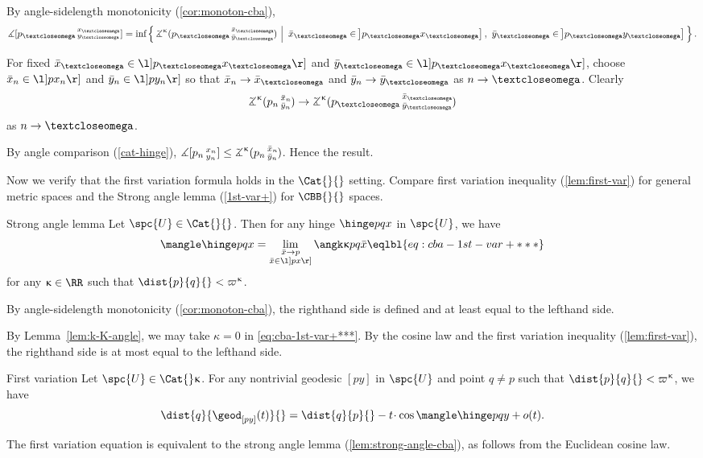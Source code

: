 By angle-sidelength monotonicity (\ref{cor:monoton-cba}),
\[\mangle\hinge{p_\o}{x_\o}{y_\o}
=
\inf\set{\angk\kappa{p_\o}{\bar x_\o}{\bar y_\o}}{\bar x_\o \in \l]p_\o x_\o\r],\ \bar y_\o\in \l]p_\o y_\o\r]}.\]

For fixed $\bar x_\o \in \l]p_\o x_\o\r]$ 
and $\bar y_\o\in \l]p_\o x_\o\r]$,
choose $\bar x_n\in \l] p x_n \r]$ and $\bar y_n\in \l] p y_n \r]$ so that $\bar x_n\to \bar x_\o$ 
and $\bar y_n\to \bar y_\o$ as $n\to\o$.
Clearly 
\[\angk\kappa{p_n}{\bar x_n}{\bar y_n}
\to 
\angk\kappa{p_\o}{\bar x_\o}{\bar y_\o}\] 
as $n\to\o$.

By angle comparison (\ref{cat-hinge}), $\mangle\hinge{p_n}{x_n}{y_n}\le \angk\kappa{p_n}{\bar x_n}{\bar y_n}$.
Hence the result.
\qeds

Now we verify that the first variation formula 
holds in the $\Cat{}{}$ setting. 
Compare first variation inequality (\ref{lem:first-var}) for general metric spaces and the
Strong angle lemma (\ref{1st-var+}) for $\CBB{}{}$ spaces. 

\begin{thm}{Strong angle lemma}
\label{lem:strong-angle-cba}
Let $\spc{U}\in \Cat{}{}$.
Then for any hinge  $\hinge  p q x$ in $\spc{U}$, 
we have
\[\mangle\hinge p q x
=
\lim_{
\substack{
\bar x\to p
\\
\bar x\in\l]px\r]}}\angk\kappa p q{\bar x}\eqlbl{eq:cba-1st-var+***}\]
for any $\kappa\in\RR$ such that $\dist{p}{q}{}<\varpi\kappa$.
\end{thm}

By angle-sidelength  monotonicity  (\ref{cor:monoton-cba}), the righthand side is defined and at least equal to the lefthand side. 

By Lemma~\ref{lem:k-K-angle}, we may take $\kappa = 0$ in \ref{eq:cba-1st-var+***}.  
By the cosine law and the first variation inequality (\ref{lem:first-var}),  
the righthand side is at most equal to the lefthand side.
\qeds



\begin{thm}{First variation}\label{thm:1st-var-cba}
Let $\spc{U}\in \Cat{}\kappa$.
For any nontrivial geodesic $[py]$ in $\spc{U}$ and point $q\ne p$ such that  $\dist{p}{q}{}<\varpi\kappa$, we have 
\[\dist{q}{\geod_{[p y]}(t)}{}
=
\dist{q}{p}{}-t\cdot\cos\mangle\hinge p q y+o(t).
\]
\end{thm}

The first variation equation is equivalent to the strong angle lemma (\ref{lem:strong-angle-cba}), as follows from the Euclidean cosine law.
\qeds

